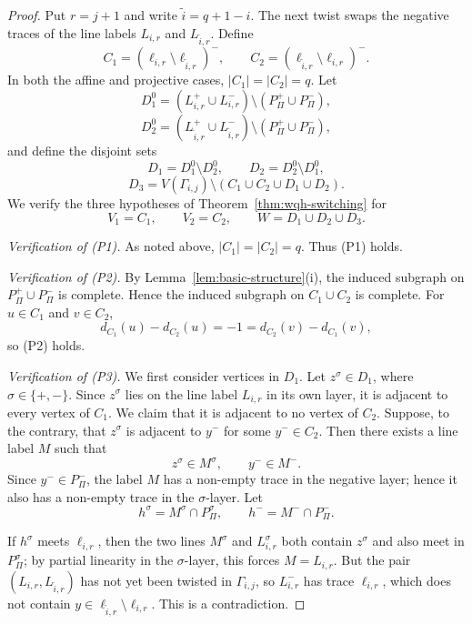 \documentclass[reqno,a4paper,11pt]{article}
\theoremstyle{definition}
\theoremstyle{remark}
\begin{document}
\begin{proof}
Put $r=j+1$ and write $\widetilde i=q+1-i$.
The next twist swaps the negative traces of the line labels $L_{i,r}$ and $L_{\widetilde i,r}$.
Define
\[
C_1=(\ell_{i,r}\setminus \ell_{\widetilde i,r})^-,
\qquad
C_2=(\ell_{\widetilde i,r}\setminus \ell_{i,r})^-.
\]
In both the affine and projective cases, $|C_1|=|C_2|=q$.
Let
\[
D_1^0=(L_{i,r}^+\cup L_{i,r}^-)\setminus (P_\Pi^+\cup P_\Pi^-),
\]
\[
D_2^0=(L_{\widetilde i,r}^+\cup L_{\widetilde i,r}^-)\setminus (P_\Pi^+\cup P_\Pi^-),
\]
and define the disjoint sets
\[
D_1=D_1^0\setminus D_2^0,
\qquad
D_2=D_2^0\setminus D_1^0,
\]
\[
D_3=V(\Gamma_{i,j})\setminus (C_1\cup C_2\cup D_1\cup D_2).
\]
We verify the three hypotheses of Theorem~\ref{thm:wqh-switching} for
\[
V_1=C_1,
\qquad
V_2=C_2,
\qquad
W=D_1\cup D_2\cup D_3.
\]

\smallskip
\noindent\emph{Verification of (P1).}
As noted above, $|C_1|=|C_2|=q$.
Thus (P1) holds.

\smallskip
\noindent\emph{Verification of (P2).}
By Lemma~\ref{lem:basic-structure}(i), the induced subgraph on $P_\Pi^+\cup P_\Pi^-$ is complete.
Hence the induced subgraph on $C_1\cup C_2$ is complete.
For $u\in C_1$ and $v\in C_2$,
\[
d_{C_1}(u)-d_{C_2}(u)=-1=d_{C_2}(v)-d_{C_1}(v),
\]
so (P2) holds.

\smallskip
\noindent\emph{Verification of (P3).}
We first consider vertices in $D_1$.
Let $z^\sigma\in D_1$, where $\sigma\in\{+,-\}$.
Since $z^\sigma$ lies on the line label $L_{i,r}$ in its own layer, it is adjacent to every vertex of $C_1$.
We claim that it is adjacent to no vertex of $C_2$.
Suppose, to the contrary, that $z^\sigma$ is adjacent to $y^-$ for some $y^-\in C_2$.
Then there exists a line label $M$ such that
\[
z^\sigma\in M^\sigma,
\qquad
 y^-\in M^-.
\]
Since $y^-\in P_\Pi^-$, the label $M$ has a non-empty trace in the negative layer; hence it also has a non-empty trace in the $\sigma$-layer.
Let
\[
h^\sigma=M^\sigma\cap P_\Pi^\sigma,
\qquad
h^-=M^-\cap P_\Pi^-.
\]

If \(h^\sigma\) meets \(\ell_{i,r}\), then the two lines
\(M^\sigma\) and \(L_{i,r}^\sigma\) both contain \(z^\sigma\) and also
meet in \(P_\Pi^\sigma\); by partial linearity in the \(\sigma\)-layer,
this forces \(M=L_{i,r}\).
But the pair $(L_{i,r},L_{\widetilde i,r})$ has not yet been twisted in $\Gamma_{i,j}$, so $L_{i,r}^-$ has trace $\ell_{i,r}$, which does not contain $y\in\ell_{\widetilde i,r}\setminus\ell_{i,r}$.
This is a contradiction.


\end{proof}
\end{document}
